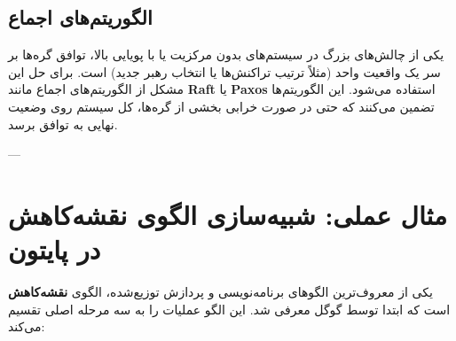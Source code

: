 \documentclass[12pt,a4paper,openany]{book}
\begin{document}
\subsection{الگوریتم‌های اجماع }

یکی از چالش‌های بزرگ در سیستم‌های بدون مرکزیت یا با پویایی بالا، توافق گره‌ها بر سر یک واقعیت واحد (مثلاً ترتیب تراکنش‌ها یا انتخاب رهبر جدید) است. برای حل این مشکل از الگوریتم‌های اجماع مانند \textbf{Raft} یا \textbf{Paxos} استفاده می‌شود. این الگوریتم‌ها تضمین می‌کنند که حتی در صورت خرابی بخشی از گره‌ها، کل سیستم روی وضعیت نهایی به توافق برسد.

---

\section{مثال عملی: شبیه‌سازی الگوی نقشه‌کاهش  در پایتون}

یکی از معروف‌ترین الگوهای برنامه‌نویسی و پردازش توزیع‌شده، الگوی \textbf{نقشه‌کاهش } است که ابتدا توسط گوگل معرفی شد. این الگو عملیات را به سه مرحله اصلی تقسیم می‌کند:
\end{document}
